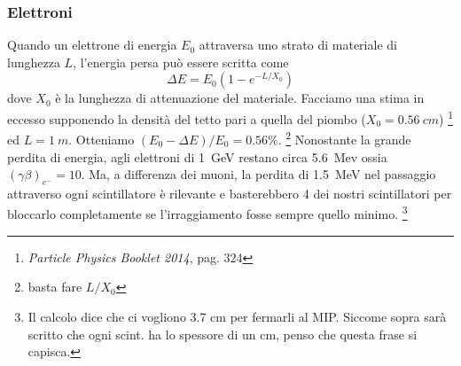 \documentclass[a4paper]{article}
\begin{document}
\subsubsection*{Elettroni} 
Quando un elettrone di energia $E_0$ attraversa uno strato di materiale di lunghezza $L$, l'energia persa può essere scritta come 
\begin{equation}
\Delta E=E_0(1-e^{-L/X_0})  \label{Eres}
\end{equation}
dove $X_0$ è la lunghezza di attenuazione del materiale.
Facciamo una stima in eccesso supponendo la densità del tetto pari a quella del piombo ($X_0=\SI{0.56}{cm}$)%
\footnote{\emph{Particle Physics Booklet 2014}, pag. 324}
ed $L=\SI{1}{m}$. Otteniamo $(E_0-\Delta E)/E_0=0.56\%$. \footnote{basta fare $L/X_0$} Nonostante la grande perdita di energia, agli elettroni di \SI{1}{GeV} restano circa \SI{5.6}{Mev} ossia $(\gamma\beta)_{e^-}=10$. Ma, a differenza dei muoni, la perdita di \SI{1.5}{MeV} nel passaggio attraverso ogni scintillatore è rilevante e basterebbero 4 dei nostri scintillatori per bloccarlo completamente se l'irraggiamento fosse sempre quello minimo. 
\footnote{Il calcolo dice che ci vogliono 3.7 cm per fermarli al MIP. Siccome sopra sarà scritto che ogni scint. ha lo spessore di un cm, penso che questa frase si capisca.}
\end{document}
